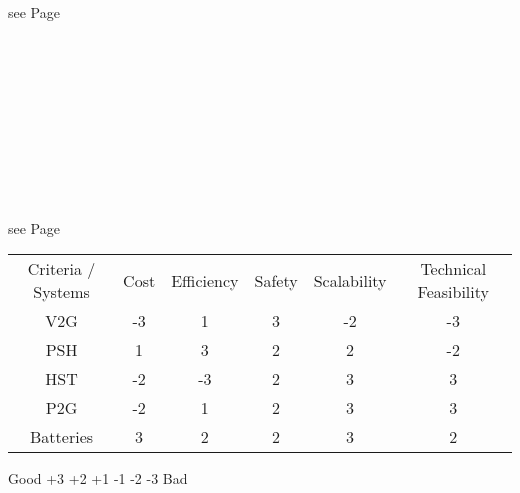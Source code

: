 \begin{parcolumns}[colwidths={1=2.5 cm, 2=10 cm, 3=2.5cm}]{3}
{\begin{tiny}
see Page \pageref{PowertoGas_Christian} \\ \\ \\ \\ \\ \\ \\ \\ \\ \\ \\
see Page \pageref{Batteries} 
\end{tiny}
}
\end{parcolumns}

\begin{table}[h]
\centering 
\begin{tabular}[h]{cccccc}
Criteria / Systems & Cost & Efficiency & Safety & Scalability & Technical Feasibility \\ 
V2G & -3 & 1 & 3 & -2 & -3 \\
PSH & 1 & 3 & 2 & 2 & -2 \\
HST & -2 & -3 & 2 & 3 & 3 \\
P2G & -2 & 1 & 2 & 3 & 3 \\
Batteries & 3 & 2 & 2 & 3 & 2 \\
\end{tabular}
\end{table}
\centerline{Good		+3	+2	+1	-1	-2	-3		  Bad}
